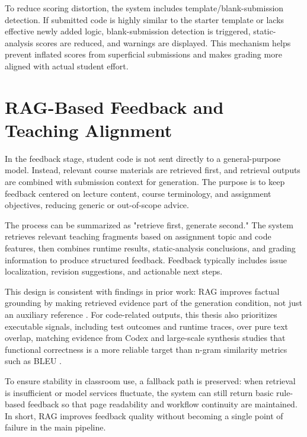 To reduce scoring distortion, the system includes template/blank-submission detection. If submitted code is highly similar to the starter template or lacks effective newly added logic, blank-submission detection is triggered, static-analysis scores are reduced, and warnings are displayed. This mechanism helps prevent inflated scores from superficial submissions and makes grading more aligned with actual student effort.

\section{RAG-Based Feedback and Teaching Alignment}

In the feedback stage, student code is not sent directly to a general-purpose model. Instead, relevant course materials are retrieved first, and retrieval outputs are combined with submission context for generation. The purpose is to keep feedback centered on lecture content, course terminology, and assignment objectives, reducing generic or out-of-scope advice.

The process can be summarized as "retrieve first, generate second." The system retrieves relevant teaching fragments based on assignment topic and code features, then combines runtime results, static-analysis conclusions, and grading information to produce structured feedback. Feedback typically includes issue localization, revision suggestions, and actionable next steps.

This design is consistent with findings in prior work: RAG improves factual grounding by making retrieved evidence part of the generation condition, not just an auxiliary reference \cite{ref3_lewis2020}. For code-related outputs, this thesis also prioritizes executable signals, including test outcomes and runtime traces, over pure text overlap, matching evidence from Codex and large-scale synthesis studies that functional correctness is a more reliable target than n-gram similarity metrics such as BLEU \cite{ref5_chen2021,ref6_austin2021}.

To ensure stability in classroom use, a fallback path is preserved: when retrieval is insufficient or model services fluctuate, the system can still return basic rule-based feedback so that page readability and workflow continuity are maintained. In short, RAG improves feedback quality without becoming a single point of failure in the main pipeline.

